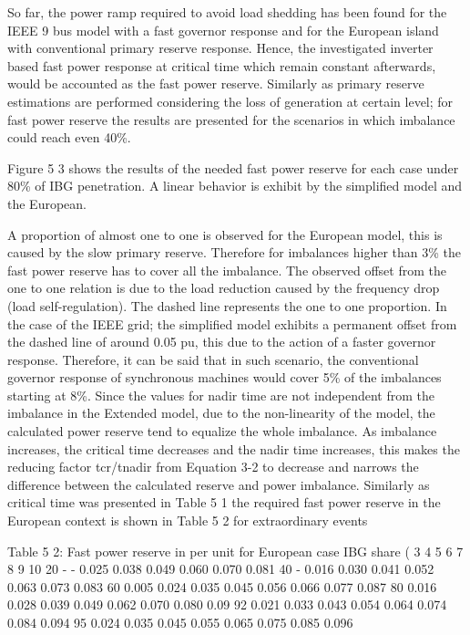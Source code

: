 So far, the power ramp required to avoid load shedding has been found for the IEEE 9 bus model with a fast governor response and for the European island with conventional primary reserve response. Hence, the investigated inverter based fast power response at critical time which remain constant afterwards, would be accounted as the fast power reserve. Similarly as primary reserve estimations are performed considering the loss of generation at certain level; for fast power reserve the results are presented for the scenarios in which imbalance could reach even 40\%.

 Figure 5 3 shows the results of the needed fast power reserve for each case under 80\% of IBG penetration. A linear behavior is exhibit by the simplified model and the European.

A proportion of almost one to one is observed for the European model, this is caused by the slow primary reserve. Therefore for imbalances higher than 3\% the fast power reserve has to cover all the imbalance. The observed offset from the one to one relation is due to the load reduction caused by the frequency drop (load self-regulation). The dashed line represents the one to one proportion. In the case of the IEEE grid; the simplified model exhibits a permanent offset from the dashed line of around 0.05 pu, this due to the action of a faster governor response. Therefore, it can be said that in such scenario, the conventional governor response of synchronous machines would cover 5\% of the imbalances starting at 8\%. Since the values for nadir time are not independent from the imbalance in the Extended model, due to the non-linearity of the model, the calculated power reserve tend to equalize the whole imbalance. As imbalance increases, the critical time decreases and the nadir time increases, this makes the reducing factor tcr/tnadir from Equation 3-2 to decrease and narrows the difference between the calculated reserve and power imbalance.
Similarly as critical time was presented in Table 5 1 the required fast power reserve in the European context is shown in Table 5 2 for extraordinary events



Table 5 2: Fast power reserve in per unit for European case
IBG share (%
	3	4	5	6	7	8	9	10
20	-	-	0.025	0.038	0.049	0.060	0.070	0.081
40	-	0.016	0.030	0.041	0.052	0.063	0.073	0.083
60	0.005	0.024	0.035	0.045	0.056	0.066	0.077	0.087
80	0.016	0.028	0.039	0.049	0.062	0.070	0.080	0.09
92	0.021	0.033	0.043	0.054	0.064	0.074	0.084	0.094
95	0.024	0.035	0.045	0.055	0.065	0.075	0.085	0.096


